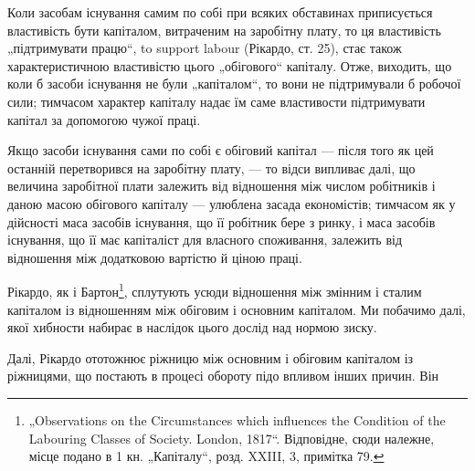 Коли засобам існування самим по собі при всяких обставинах приписується
властивість бути капіталом, витраченим на заробітну плату, то
ця властивість „підтримувати працю“, to support labour (Рікардо, ст. 25),
стає також характеристичною властивістю цього „обігового“ капіталу.
Отже, виходить, що коли б засоби існування не були „капіталом“, то
вони не підтримували б робочої сили; тимчасом характер капіталу надає
їм саме властивости підтримувати капітал за допомогою чужої праці.

Якщо засоби існування сами по собі є обіговий капітал — після того
як цей останній перетворився на заробітну плату, — то відси випливає
далі, що величина заробітної плати залежить від відношення між числом
робітників і даною масою обігового капіталу — улюблена засада економістів;
тимчасом як у дійсності маса засобів існування, що її робітник
бере з ринку, і маса засобів існування, що її має капіталіст для власного
споживання, залежить від відношення між додатковою вартістю й ціною
праці.

Рікардо, як і Бартон\footnote{
„Observations on the Circumstances which influences the Condition of the
Labouring Classes of Society. London, 1817“. Відповідне, сюди належне, місце
подано в 1 кн. „Капіталу“, розд. XXIII, 3, примітка 79.
}, сплутують усюди відношення між змінним і сталим
капіталом із відношенням між обіговим і основним капіталом. Ми побачимо
далі, якої хибности набирає в наслідок цього дослід над нормою зиску.

Далі, Рікардо ототожнює ріжницю між основним і обіговим капіталом із
ріжницями, що постають в процесі обороту підо впливом інших причин. Він
\parbreak{}  %
